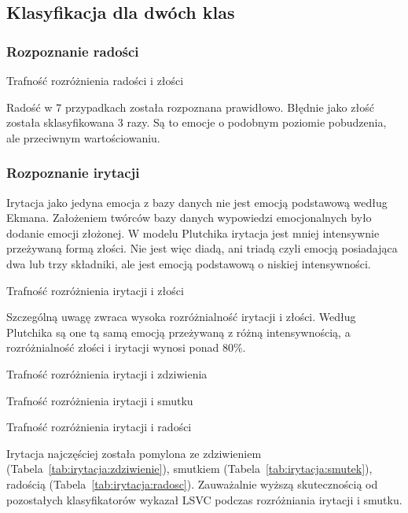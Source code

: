 \documentclass[a4paper,12pt,twoside,openany]{report}
\newcommand{\Tab}[1]{(Tabela~\ref{#1})}
\begin{document}
\subsection{Klasyfikacja dla dwóch klas}
\subsubsection{Rozpoznanie radości}
\begin{table}[hc!]
	\caption{Trafność rozróżnienia radości i złości}
	\centering
	
\end{table}
Radość w 7 przypadkach została rozpoznana prawidłowo. 
Błędnie jako złość została sklasyfikowana 3 razy. 
Są to emocje o podobnym poziomie pobudzenia, ale przeciwnym wartościowaniu.
\subsubsection{Rozpoznanie irytacji}
Irytacja jako jedyna emocja z bazy danych nie jest emocją podstawową według Ekmana.
Założeniem twórców bazy danych wypowiedzi emocjonalnych było dodanie emocji złożonej.
W modelu Plutchika irytacja jest mniej intensywnie przeżywaną formą złości.
Nie jest więc diadą, ani triadą czyli emocją posiadająca dwa lub trzy składniki,
ale jest emocją podstawową o niskiej intensywności.
\begin{table}[hc!]
	\caption{Trafność rozróżnienia irytacji i złości}
	\centering
	
	\label{tab:irytacja:zlosc}
\end{table}
Szczególną uwagę zwraca wysoka rozróżnialność irytacji i złości.
Według Plutchika są one tą samą emocją przeżywaną z różną intensywnością,
a rozróżnialność złości i irytacji wynosi ponad 80\%.

\begin{table}[hc!]
	\caption{Trafność rozróżnienia irytacji i zdziwienia}
	\centering
	
	\label{tab:irytacja:zdziwienie}
\end{table}
\begin{table}[hc!]
	\caption{Trafność rozróżnienia irytacji i smutku}
	\centering
	
	\label{tab:irytacja:smutek}
\end{table}
\begin{table}[hc!]
	\caption{Trafność rozróżnienia irytacji i radości}
	\centering
	
	\label{tab:irytacja:radosc}
\end{table}
Irytacja najczęściej została pomylona ze zdziwieniem \Tab{tab:irytacja:zdziwienie}, smutkiem \Tab{tab:irytacja:smutek}, radością \Tab{tab:irytacja:radosc}.
Zauważalnie wyższą skutecznością od pozostałych klasyfikatorów wykazał LSVC podczas rozróżniania irytacji i smutku.
\end{document}
